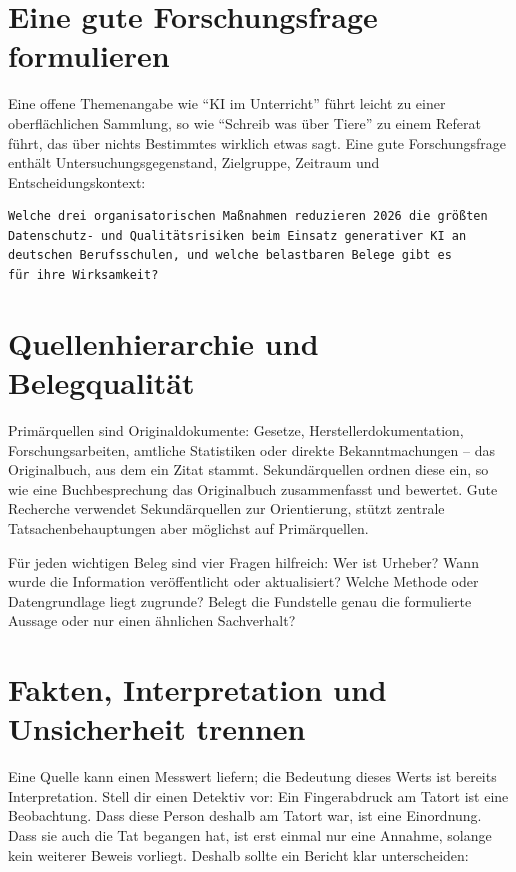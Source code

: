 \section{Eine gute Forschungsfrage formulieren}

Eine offene Themenangabe wie ``KI im Unterricht'' führt leicht zu einer oberflächlichen Sammlung, so wie ``Schreib was über Tiere'' zu einem Referat führt, das über nichts Bestimmtes wirklich etwas sagt. Eine gute Forschungsfrage enthält Untersuchungsgegenstand, Zielgruppe, Zeitraum und Entscheidungskontext:

\begin{lstlisting}
Welche drei organisatorischen Maßnahmen reduzieren 2026 die größten
Datenschutz- und Qualitätsrisiken beim Einsatz generativer KI an 
deutschen Berufsschulen, und welche belastbaren Belege gibt es 
für ihre Wirksamkeit?
\end{lstlisting}

\section{Quellenhierarchie und Belegqualität}

Primärquellen sind Originaldokumente: Gesetze, Herstellerdokumentation, Forschungsarbeiten, amtliche Statistiken oder direkte Bekanntmachungen -- das Originalbuch, aus dem ein Zitat stammt. Sekundärquellen ordnen diese ein, so wie eine Buchbesprechung das Originalbuch zusammenfasst und bewertet. Gute Recherche verwendet Sekundärquellen zur Orientierung, stützt zentrale Tatsachenbehauptungen aber möglichst auf Primärquellen.

Für jeden wichtigen Beleg sind vier Fragen hilfreich: Wer ist Urheber? Wann wurde die Information veröffentlicht oder aktualisiert? Welche Methode oder Datengrundlage liegt zugrunde? Belegt die Fundstelle genau die formulierte Aussage oder nur einen ähnlichen Sachverhalt?

\section{Fakten, Interpretation und Unsicherheit trennen}

Eine Quelle kann einen Messwert liefern; die Bedeutung dieses Werts ist bereits Interpretation. Stell dir einen Detektiv vor: Ein Fingerabdruck am Tatort ist eine Beobachtung. Dass diese Person deshalb am Tatort war, ist eine Einordnung. Dass sie auch die Tat begangen hat, ist erst einmal nur eine Annahme, solange kein weiterer Beweis vorliegt. Deshalb sollte ein Bericht klar unterscheiden:

